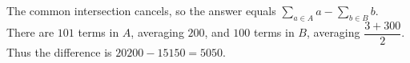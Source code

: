 The common intersection cancels, so the answer equals $\sum_{a\in A}a-\sum_{b\in B}b$. There are $101$ terms in $A$, averaging $200$, and $100$ terms in $B$, averaging $\dfrac{3+300}{2}$. Thus the difference is $20200-15150=\boxed{5050}$.
